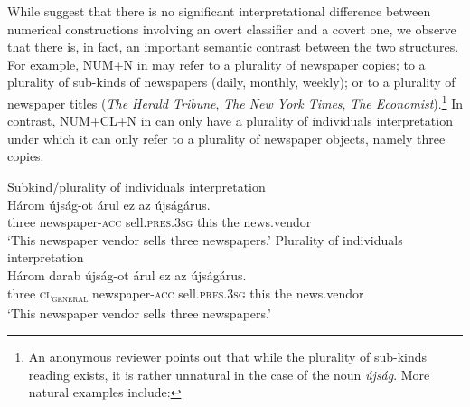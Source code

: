 \documentclass[output=paper]{langscibook}
\begin{document}
While \citet{schvarcz-rothstein-17} suggest that there is no significant interpretational difference between numerical constructions involving an overt classifier and a covert one, we observe that there is, in fact, an important semantic contrast between the two structures. For example, NUM+N in  may refer to a plurality of newspaper copies; to a plurality of sub-kinds of newspapers (daily, monthly, weekly); or to a plurality of newspaper titles (\textit{The Herald Tribune}, \textit{The New York Times}, \textit{The Economist}).\footnote{An anonymous reviewer points out that while the plurality of sub-kinds reading exists, it is rather unnatural in the case of the noun \textit{újság}. More natural examples include:

\z} In contrast, NUM+CL+N in  can only have a plurality of individuals interpretation under which it can only refer to a plurality of newspaper objects, namely three copies.%

\ea \label{schv-nem:ex:8}
\ea Subkind/plurality of individuals interpretation\label{schv-nem:ex:8a}\\
\gll Három újság-ot árul ez az újságárus.\\
three newspaper-\textsc{acc} sell.\textsc{pres}.\textsc{3sg} this the news.vendor\\
\glt `This newspaper vendor sells three newspapers.'  %
\ex Plurality of individuals interpretation\label{schv-nem:ex:8b}\\
\gll Három darab újság-ot árul ez az újságárus.\\
three \textsc{cl\textsubscript{general}} newspaper-\textsc{acc} sell.\textsc{pres}.\textsc{3sg} this the news.vendor\\
\glt `This newspaper vendor sells three newspapers.'   %
\z
\z
\end{document}
